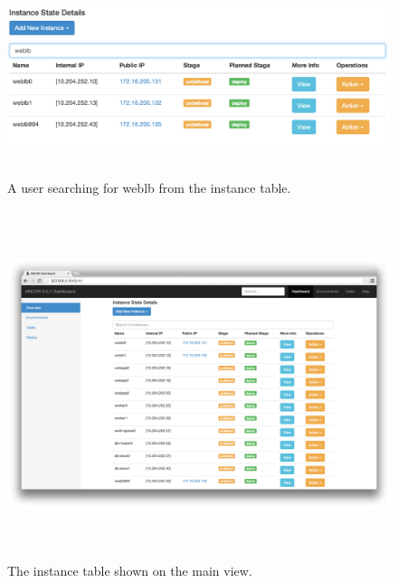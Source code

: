 \begin{figure}[htb]%

    \includegraphics[height=2.3in]{figures/instance-table-filter.png}

    \caption[A user searching for weblb from the instance table.
    ]{A user searching for weblb from the instance table.}

    \label{instanceTableFilter}
\end{figure}

\begin{figure}[htb]%

    \includegraphics[height=4.0in]{figures/instance-table-view.png}

    \caption[Instance table view.
    ]{The instance table shown on the main view.}

    \label{mainInstanceTableView}
\end{figure}

